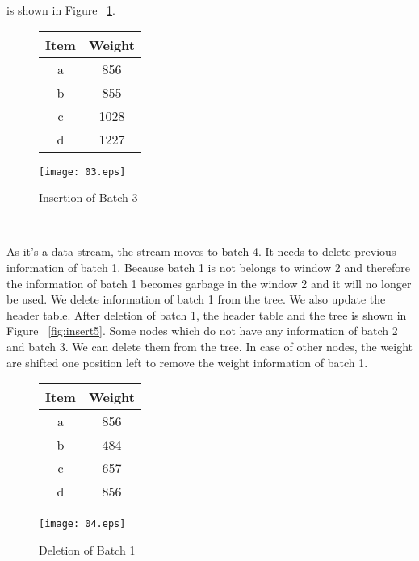 is shown in Figure ~\ref{fig:insert3}.
\begin{figure}[ht]

{\centering
\begin{minipage}{.4\textwidth}
  \centering
  
	\begin{center}
	\begin{tabular}{ |c|c| } 
	\hline
	Item & Weight \\
	\hline
	a & 856\\
	b & 855\\
	c & 1028\\
	d & 1227\\
	\hline
	\end{tabular}
\end{center}  
\end{minipage}
\hfill
\begin{minipage}{0.60\textwidth}
  \centering
  \texttt{[image: 03.eps]}
\end{minipage}
}
\caption{Insertion of Batch 3}
\label{fig:insert3}
\end{figure} 
\\
\par As it’s a data stream, the stream moves to batch 4. It needs to delete previous information of batch 1. Because batch 1 is not belongs to window 2 
and therefore the information of batch 1 becomes garbage in the window 2 and it will no longer be used. We delete information of batch 1 from the tree. We also update the header table. 
After deletion of batch 1, the header table and the tree is shown in Figure ~\ref{fig:insert5}. Some nodes which do not have any information of batch 2 and batch 3. 
We can delete them from the tree. In case of other nodes, the weight are shifted one position left to remove the weight information of batch 1.
%
\begin{figure}[ht]

{\centering
\begin{minipage}{.4\textwidth}
  \centering
  
	\begin{center}
	\begin{tabular}{ |c|c| } 
	\hline
	Item & Weight \\
	\hline
	a & 856\\
	b & 484\\
	c & 657\\
	d & 856\\
	\hline
	\end{tabular}
\end{center}  
\end{minipage}
\hfill
\begin{minipage}{0.60\textwidth}
  \centering
  \texttt{[image: 04.eps]}
\end{minipage}
}
\caption{Deletion of Batch 1}
\label{fig:insert4}
\end{figure} 
\\


